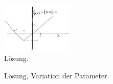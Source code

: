 \begin{figure}[h]
    \centering
    \includegraphics[width=0.3\textwidth]{img/loesung_abs.png}
    \caption{Lösung. }
    \label{fig:Loes_abs}
\end{figure}

\begin{figure}[h]
    \centering
    
    \caption{Lösung, Variation der Parameter.}
    \label{fig:Loes_abs_var}
\end{figure}



